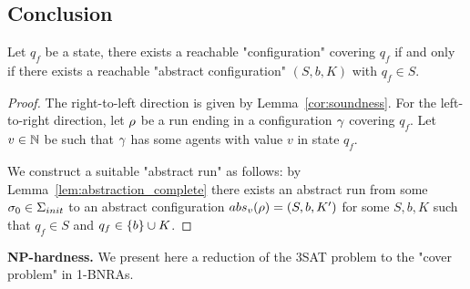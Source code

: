 \subsection{Conclusion}


\begin{proposition}
	\label{prop:sound-and-complete}
	Let $q_f$ be a state, there exists a reachable "configuration" covering $q_f$ if and only if there exists a reachable "abstract configuration" $(S,b,K)$ with $q_f \in S$.
\end{proposition}

\begin{proof}
	The right-to-left direction is given by Lemma~\ref{cor:soundness}.
	For the left-to-right direction, let $\rho$ be a run ending in a configuration $\gamma$ covering $q_f$. Let $v \in \mathbb{N}$ be such that $\gamma$ has some agents with value $v$ in state $q_f$.
	
	We construct a suitable "abstract run" as follows: by Lemma~\ref{lem:abstraction_complete} there exists an abstract run from some $\sigma_0 \in \aconfiginitset$ to an abstract configuration $\absproj{v}{\run} = (S, b, K')$ for some $S,b,K$ such that $q_f \in S$ and $q_f \in \{b\} \cup K$.
	
\end{proof}




\textbf{NP-hardness.} We present here a reduction of the 3SAT problem to the "cover problem" in 1-BNRAs.

